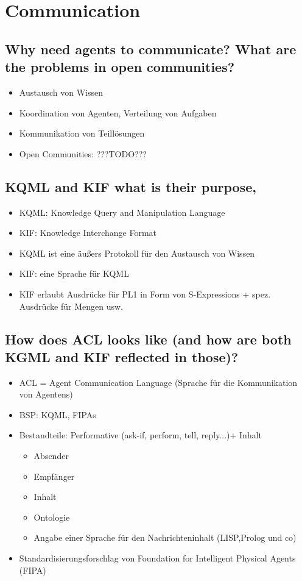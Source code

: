 \section{Communication}
\subsection{Why need agents to communicate? What are the problems in open communities?}
\begin{itemize}
	\item Austausch von Wissen
	\item Koordination von Agenten, Verteilung von Aufgaben
	\item Kommunikation von Teillösungen
	\item Open Communities: ???TODO???
\end{itemize}
\subsection{KQML and KIF what is their purpose,}
\begin{itemize}
	\item KQML: Knowledge Query and Manipulation Language
	\item KIF: Knowledge Interchange Format
	\item KQML ist eine äußers Protokoll für den Austausch von Wissen
	\item KIF: eine Sprache für KQML
	\item KIF erlaubt Ausdrücke für PL1 in Form von S-Expressions + spez. Ausdrücke für Mengen usw.
\end{itemize}
\subsection{How does ACL looks like (and how are both KGML and KIF reflected in those)?}
\begin{itemize}
	\item ACL = Agent Communication Language (Sprache für die Kommunikation von Agentens)
	\item BSP: KQML, FIPAs
	\item Bestandteile: Performative (ask-if, perform, tell, reply...)+ Inhalt
		\begin{itemize}
			\item Absender
			\item Empfänger
			\item Inhalt
			\item Ontologie
			\item Angabe einer Sprache für den Nachrichteninhalt (LISP,Prolog und co)
		\end{itemize}
	\item Standardisierungsforschlag von Foundation for Intelligent Physical Agents (FIPA)
\end{itemize}

